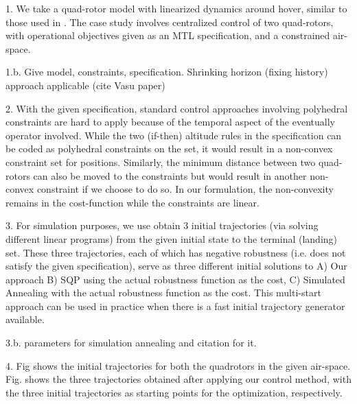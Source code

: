 1. We take a quad-rotor model with linearized dynamics around hover, similar to those used in \cite{}. The case study involves centralized control of two quad-rotors, with operational objectives given as an MTL specification, and a constrained air-space.

1.b. Give model, constraints, specification. Shrinking horizon (fixing history) approach applicable (cite Vasu paper)

2. With the given specification, standard control approaches involving polyhedral constraints are hard to apply because of the temporal aspect of the eventually operator involved. While the two (if-then) altitude rules in the specification can be coded as polyhedral constraints on the set, it would result in a non-convex constraint set for positions. Similarly, the minimum distance between two quad-rotors can also be moved to the constraints but would result in another non-convex constraint if we choose to do so. In our formulation, the non-convexity remains in the cost-function while the constraints are linear.

3. For simulation purposes, we use obtain 3 initial trajectories (via solving different linear programs) from the given initial state to the terminal (landing) set. These three trajectories, each of which has negative robustness (i.e. does not satisfy the given specification), serve as three different initial solutions to A) Our approach B) SQP using the actual robustness function as the cost, C) Simulated Annealing with the actual robustness function as the cost. This multi-start approach can be used in practice when there is a fast initial trajectory generator available.

3.b. parameters for simulation annealing and citation for it.

4. Fig shows the initial trajectories for both the quadrotors in the given air-space. Fig. shows the three trajectories obtained after applying our control method, with the three initial trajectories as starting points for the optimization, respectively. 

